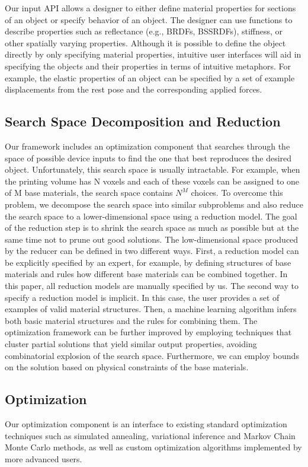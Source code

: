 \documentclass[annual]{acmsiggraph}
\begin{document}
Our input API allows a designer to either
define material properties for sections of an object
or specify behavior of an object.
The designer
can use functions to describe properties such as reflectance (e.g., BRDFs, BSSRDFs), 
stiffness, or other spatially varying properties. 
Although it is possible to define the object directly by only specifying material
properties, intuitive user
interfaces will aid in specifying the objects and their properties
in terms of intuitive metaphors.
For example, the elastic properties of an object can be specified by a set of
example displacements from the rest pose and the corresponding applied forces.
\subsection{Search Space Decomposition and Reduction}
Our framework includes an optimization component that
searches through the space of possible device inputs
to find the one that best reproduces
the desired object. Unfortunately, this search space
is usually intractable. For example, when the printing
volume has N voxels and each of these voxels can be
assigned to one of M base materials, the search space
contains $N^M$ choices. 
To overcome this problem, we decompose the search
space into similar subproblems and also reduce
the search space to a lower-dimensional space using a reduction model. 
The goal of the reduction step is to
shrink the search space as much as possible but at the
same time not to prune out good solutions. The low-dimensional space produced by the
reducer can be defined in two different ways. First, a reduction model can be explicitly specified by an expert, for
example, by defining structures of base materials and rules how different base materials can be combined together.
In this paper, all reduction models are manually specified by us.
The second way to specify a reduction model is implicit. In this case, the user provides a set of examples of
valid material structures. Then, a machine learning algorithm infers both basic material structures and the rules
for combining them. The optimization framework can be further improved by employing techniques that cluster
partial solutions that yield similar output properties, avoiding combinatorial explosion of the search space.
Furthermore, we can employ bounds on the solution based on physical constraints of the base materials.
\subsection{Optimization}
Our optimization component is an interface to
existing standard optimization techniques
such as simulated annealing, variational inference and
Markov Chain Monte Carlo methods,
as well as custom optimization algorithms implemented
by more advanced users.
\end{document}
